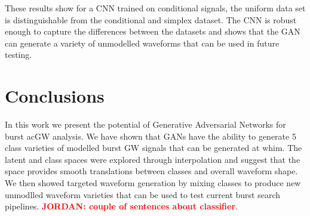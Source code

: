 \documentclass[12pt]{iopart}
\newcommand{\jordan}[1]{\textbf{\textcolor{red}{JORDAN: #1}}}
\begin{document}
These results show for a CNN trained on conditional signals, the uniform data set is distinguishable from the conditional and simplex dataset. The CNN is robust enough to capture the differences between the datasets and shows that the GAN can generate a variety of unmodelled waveforms that can be used in future testing. 

\section{Conclusions}
In this work we present the potential of Generative Adversarial Networks for burst ac{GW} analysis. We have shown that GANs have the ability to generate 5 class varieties of modelled burst \ac{GW} signals that can be generated at whim. The latent and class spaces were explored through interpolation and suggest that the space provides smooth translations between classes and overall waveform shape. We then showed targeted waveform generation by mixing classes to produce new unmodlled waveform varieties that can be used to test current burst search pipelines. \jordan{couple of sentences about classifier}. 
\end{document}
